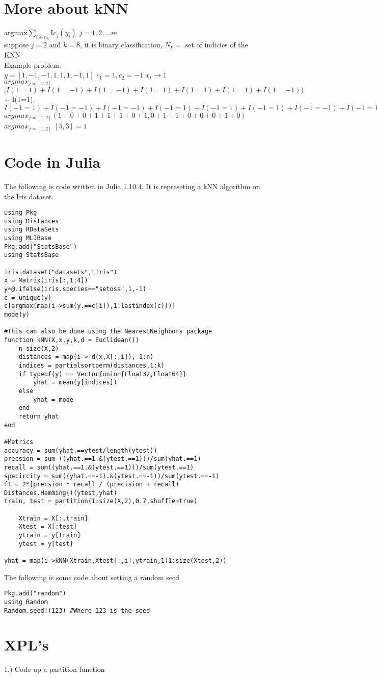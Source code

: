 \section{More about kNN}
argmax$\sum_{i \in n_k}^{}$I$c_j(y_i)$ $j={1,2,...m}$ \\
suppose $j=2$ and $k=8$, it is binary classification, $N_k=$ set of indicies of the KNN \\

Example problem: \\
$y=[1,-1,-1,1,1,1,-1,1]$ $c_1=1,c_2=-1$ $x_t \rightarrow 1$ \\
$argmax_{j=[1,2]}$$[I(1=1)+I(1=-1)+I(1=-1)+I(1=1)+I(1=1)+I(1=1)+I(1=-1))$ \\
 + I(1=1), \\
$I(-1=1)+I(-1=-1)+I(-1=-1)+I(-1=1)+I(-1=1)+I(-1=1)+I(-1=-1)+I(-1=1)$ \\
$argmax_{j=[1,2]} (1+0+0+1+1+1+0+1, 0+1+1+0+0+0+1+0)$\\
$argmax_{j=[1,2]}$ $[5,3]=1$


\section{Code in Julia}
The following is code written in Julia 1.10.4. 
It is represeting a kNN algorithm on the Iris dataset.

\begin{lstlisting}
using Pkg
using Distances
using RDataSets
using MLJBase
Pkg.add("StatsBase")
using StatsBase

iris=dataset("datasets","Iris")
x = Matrix(iris[:,1:4])
y=@.ifelse(iris.species=="setosa",1,-1)
c = unique(y)
c[argmax(map(i->sum(y.==c[i]),1:lastindex(c)))]
mode(y)

#This can also be done using the NearestNeighbors package
function kNN(X,x,y,k,d = Euclidean())
    n-size(X,2)
    distances = map(i-> d(x,X[:,i]), 1:n)
    indices = partialsortperm(distances,1:k)
    if typeof(y) == Vector{union{Float32,Float64}}
        yhat = mean(y[indices])
    else
        yhat = mode
    end
    return yhat
end

#Metrics
accuracy = sum(yhat.==ytest/length(ytest))
precsion = sum ((yhat.==1.&(ytest.==1)))/sum(yhat.==1)
recall = sum((yhat.==1.&(ytest.==1)))/sum(ytest.==1)
specircity = sum((yhat.==-1).&(ytest.==-1))/sum(ytest.==-1)
f1 = 2*[precsion * recall / (precision + recall)
Distances.Hamming()(ytest,yhat)
train, test = partition(1:size(X,2),0.7,shuffle=true)

    Xtrain = X[:,train]
    Xtest = X[:test]
    ytrain = y[train]
    ytest = y[test]

yhat = map(i->kNN(Xtrain,Xtest[:,i],ytrain,1)1:size(Xtest,2))

\end{lstlisting}

The following is some code about setting a random seed
\begin{lstlisting}
Pkg.add("random")
using Random
Random.seed!(123) #Where 123 is the seed
\end{lstlisting}


\section{XPL's}
1.) Code up a partition function
